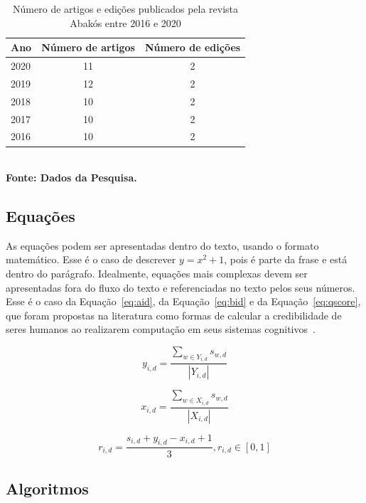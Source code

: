 \documentclass[a4paper,12pt]{article}
\begin{document}
	\begin{table}[ht]
		\centering
		\caption{Número de artigos e edições publicados pela revista Abakós entre 2016 e 2020}
		\label{tab:tabela1}
		\begin{tabular}{l|c|c}
			\hline
			\textbf{Ano}	& \textbf{Número de artigos} & \textbf{Número de edições} \\
			\hline
			2020	& 11 &  2 \\
			2019	& 12 &  2 \\
			2018	& 10 &  2 \\
			2017   & 10  &  2 \\
			2016	& 10  &  2 \\
			\hline
		\end{tabular}
		{\footnotesize\\ \textbf{Fonte: Dados da Pesquisa.}}
	\end{table}
	
	
	\subsection{\esp Equações}
	
	As equações podem ser apresentadas dentro do texto, usando o formato matemático. Esse é o caso de descrever $y=x^2+1$, pois é parte da frase e está dentro do parágrafo. Idealmente, equações mais complexas devem ser apresentadas fora do fluxo do texto e referenciadas no texto pelos seus números. Esse é o caso da Equação~\ref{eq:aid}, da Equação~\ref{eq:bid} e da Equação~\ref{eq:qscore}, que foram propostas na literatura como formas de calcular a credibilidade de seres humanos ao realizarem computação em seus sistemas cognitivos~\cite{ponciano2018agreement}. 
	
	\begin{equation}
		\label{eq:aid}
		y_{i,d}=\frac{\displaystyle\sum_{w\in Y_{i,d}}s_{w,d}}{|Y_{i,d}|}
	\end{equation}
	
	\begin{equation}
		\label{eq:bid}
		x_{i,d}=\frac{\displaystyle\sum_{w\in X_{i,d}}s_{w,d}}{|X_{i,d}|}
	\end{equation}
	
	\begin{equation}
		\label{eq:qscore}
		r_{i,d} = \frac{s_{i,d} + y_{i,d}-x_{i,d} + 1}{3}, r_{i,d}\in[0,1]
	\end{equation}
	
	\subsection{Algoritmos}
	
\end{document}

